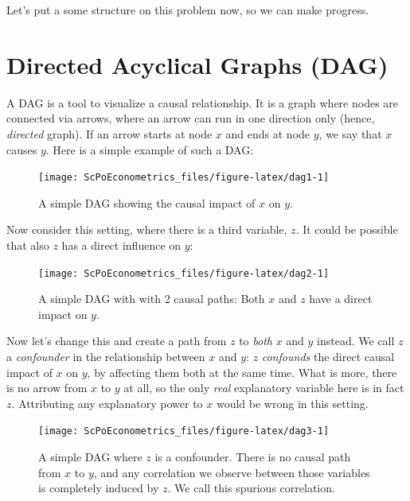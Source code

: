 \documentclass[]{book}
\begin{document}
Let's put a some structure on this problem now, so we can make progress.

\hypertarget{dags}{%
\section{Directed Acyclical Graphs (DAG)}\label{dags}}

A DAG is a tool to visualize a causal relationship. It is a graph where nodes are connected via arrows, where an arrow can run in one direction only (hence, \emph{directed} graph). If an arrow starts at node \(x\) and ends at node \(y\), we say that \(x\) causes \(y\). Here is a simple example of such a DAG:

\begin{figure}

{\centering \texttt{[image: ScPoEconometrics\_files/figure-latex/dag1-1]} 

}

\caption{A simple DAG showing the causal impact of $x$ on $y$.}\label{fig:dag1}
\end{figure}

Now consider this setting, where there is a third variable, \(z\). It could be possible that also \(z\) has a direct influence on \(y\):

\begin{figure}

{\centering \texttt{[image: ScPoEconometrics\_files/figure-latex/dag2-1]} 

}

\caption{A simple DAG with with 2 causal paths: Both $x$ and $z$ have a direct impact on $y$.}\label{fig:dag2}
\end{figure}

Now let's change this and create a path from \(z\) to \emph{both} \(x\) and \(y\) instead. We call \(z\) a \emph{confounder} in the relationship between \(x\) and \(y\): \(z\) \emph{confounds} the direct causal impact of \(x\) on \(y\), by affecting them both at the same time. What is more, there is no arrow from \(x\) to \(y\) at all, so the only \emph{real} explanatory variable here is in fact \(z\). Attributing any explanatory power to \(x\) would be wrong in this setting.

\begin{figure}

{\centering \texttt{[image: ScPoEconometrics\_files/figure-latex/dag3-1]} 

}

\caption{A simple DAG where $z$ is a confounder. There is no causal path from $x$ to $y$, and any correlation we observe between those variables is completely induced by $z$. We call this spurious correlation.}\label{fig:dag3}
\end{figure}
\end{document}
